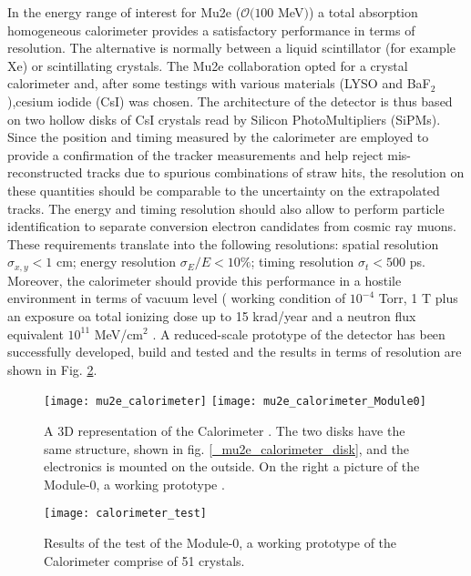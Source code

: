 \documentclass[12pt,a4paper,openright, oneside, titlepage]{book} %
\begin{document}
\noindent
In the energy range of interest for Mu2e ($ \mathcal{O}(100$ MeV$)$) 
a total absorption homogeneous calorimeter 
provides a satisfactory performance in terms of resolution. 
The alternative is normally between a liquid scintillator (for example Xe) or scintillating crystals. 
The Mu2e collaboration opted for a crystal calorimeter and, 
after some testings with various materials (LYSO and BaF$_2$),cesium iodide (CsI) was chosen. 
The architecture of the detector is thus based on two hollow disks of CsI crystals read by 
Silicon PhotoMultipliers (SiPMs).\\ 
Since the position and timing measured by the calorimeter are employed to provide  
a confirmation of the tracker measurements and help reject mis-reconstructed tracks 
due to spurious combinations of straw hits, 
the resolution on these quantities should be comparable to the uncertainty on the extrapolated tracks. 
The energy and timing resolution should also allow to perform particle identification 
to separate conversion electron candidates from cosmic ray muons. 
These requirements translate into the following resolutions: 
spatial resolution $\sigma_{x,y}<1$ cm; 
energy resolution $\sigma_E/E <10\%$; 
timing resolution $\sigma_t < 500$ ps.
Moreover, the calorimeter should provide this performance in a hostile environment
in terms of vacuum level (
working condition of $10^{-4}$ Torr, 1 T plus an exposure oa total ionizing dose up to 15 krad/year and a neutron flux equivalent $10^{11}$ MeV/cm$^2$ \cite{Donghia:2019}.
A reduced-scale prototype of the detector  has been successfully developed, build and tested and the results 
in terms of resolution are shown in Fig. \ref{_calorimeter_test}\cite{Module0:2019}.

\begin{figure}[h!]
\centering
\texttt{[image: mu2e\_calorimeter]}
\texttt{[image: mu2e\_calorimeter\_Module0]}
\caption{A 3D representation of the Calorimeter \cite{Calorimeter:2018}. The two disks have the same structure, shown in fig. \ref{_mu2e_calorimeter_disk}, and the electronics is mounted on the outside. On the right a picture of the Module-0, a working prototype \cite{Donghia:2019}.}
\label{_mu2e_calorimeter}
\end{figure}

\begin{figure}[h!]
\centering
\texttt{[image: calorimeter\_test]}
\caption{Results of the test of the Module-0, a working prototype of the Calorimeter comprise of 51 crystals. \cite{Donghia:2019} \cite{Calorimeter:2020}}
\label{_calorimeter_test}
\end{figure}
\end{document}
